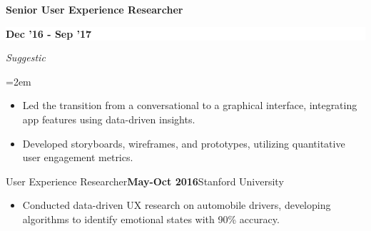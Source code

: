 \documentclass[paper=letter,fontsize=10.4pt]{scrartcl} %
\newcommand{\EducationEntry}[5]{
		\noindent \textbf{#1} \hfill      %
		\colorbox{White}{%
			\parbox{10em}{%
            \hfill\color{Black}#2}} \par  %
		\noindent \textit{#3} \par        %
		\noindent\hangindent=2em\hangafter=0 \small #4 %
		\normalsize \par}
\begin{document}
\EducationEntry{Senior User Experience Researcher}{\textbf{Dec '16 - Sep '17}}{Suggestic}{
\begin{itemize}
    \setlength\itemsep{0.05em}
    \item Led the transition from a conversational to a graphical interface, integrating app features using data-driven insights.
    \item Developed storyboards, wireframes, and prototypes, utilizing quantitative user engagement metrics.
\end{itemize}
}

\EducationEntry{User Experience Researcher}{\textbf{May-Oct 2016}}{Stanford University}{
\begin{itemize}
    \setlength\itemsep{0.05em}
    \item Conducted data-driven UX research on automobile drivers, developing algorithms to identify emotional states with 90\% accuracy.
\end{itemize}
}
\end{document}
